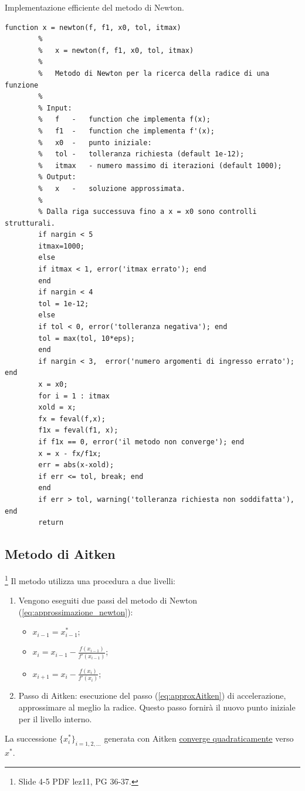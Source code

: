 \begin{algorithm}
	\caption{Implementazione efficiente del metodo di Newton.}\label{alg:polNewt}
	\begin{lstlisting}[style=Matlab-editor]
		function x = newton(f, f1, x0, tol, itmax)
		%   
		%   x = newton(f, f1, x0, tol, itmax)
		%
		%   Metodo di Newton per la ricerca della radice di una funzione
		%
		% Input:
		%   f   -   function che implementa f(x);
		%   f1  -   function che implementa f'(x);
		%   x0  -   punto iniziale:
		%   tol -   tolleranza richiesta (default 1e-12);
		%   itmax   - numero massimo di iterazioni (default 1000);
		% Output:
		%   x   -   soluzione approssimata.
		%
		% Dalla riga successuva fino a x = x0 sono controlli strutturali.
		if nargin < 5
		itmax=1000;
		else
		if itmax < 1, error('itmax errato'); end
		end
		if nargin < 4 
		tol = 1e-12;
		else
		if tol < 0, error('tolleranza negativa'); end
		tol = max(tol, 10*eps);
		end
		if nargin < 3,  error('numero argomenti di ingresso errato'); end
		x = x0;
		for i = 1 : itmax
		xold = x;
		fx = feval(f,x);
		f1x = feval(f1, x);
		if f1x == 0, error('il metodo non converge'); end
		x = x - fx/f1x;
		err = abs(x-xold);
		if err <= tol, break; end
		end
		if err > tol, warning('tolleranza richiesta non soddifatta'), end
		return
	\end{lstlisting}
\end{algorithm}

\subsection{Metodo di Aitken}
\footnote{Slide 4-5 PDF lez11, PG 36-37.}
Il metodo utilizza una procedura a due livelli:
\begin{enumerate}
	\item Vengono eseguiti due passi del metodo di Newton (\ref{eq:approssimazione_newton}): 
	\begin{itemize}
		\item $x_{i-1}=x_{i-1}^*$;
		\item $x_i=x_{i-1}-\frac{f(x_{i-1})}{f'(x_{i-1})}$;
		\item $x_{i+1}=x_i-\frac{f(x_i)}{f'(x_i)}$;
	\end{itemize}
	\item Passo di Aitken: esecuzione del passo (\ref{eq:approxAitken}) di accelerazione, approssimare al meglio la radice. Questo passo fornirà il nuovo punto iniziale per il livello interno.
\end{enumerate}
La successione $\{x_i^*\}_{i=1,2,\hdots}$ generata con Aitken \underline{converge quadraticamente} verso $x^*$.
